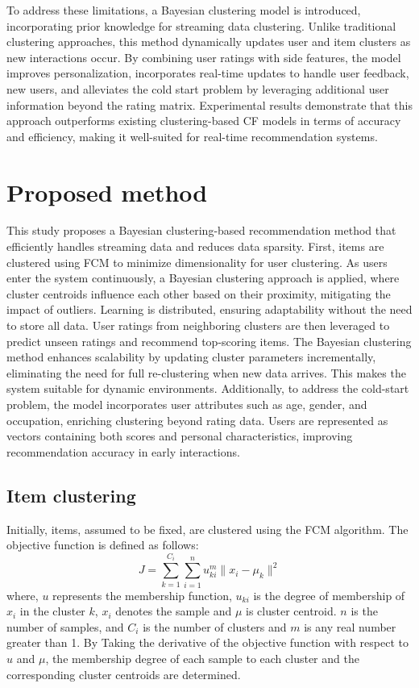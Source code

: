 \documentclass{article}
\begin{document}
To address these limitations, a Bayesian clustering model is introduced, incorporating prior knowledge for streaming data clustering. Unlike traditional clustering approaches, this method dynamically updates user and item clusters as new interactions occur. By combining user ratings with side features, the model improves personalization, incorporates real-time updates to handle user feedback, new users, and alleviates the cold start problem by leveraging additional user information beyond the rating matrix. Experimental results demonstrate that this approach outperforms existing clustering-based CF models in terms of accuracy and efficiency, making it well-suited for real-time recommendation systems. 

\section{Proposed method}

This study proposes a Bayesian clustering-based recommendation method that efficiently handles streaming data and reduces data sparsity. First, items are clustered using FCM to minimize dimensionality for user clustering. As users enter the system continuously, a Bayesian clustering approach is applied, where cluster centroids influence each other based on their proximity, mitigating the impact of outliers. Learning is distributed, ensuring adaptability without the need to store all data. User ratings from neighboring clusters are then leveraged to predict unseen ratings and recommend top-scoring items. The Bayesian clustering method enhances scalability by updating cluster parameters incrementally, eliminating the need for full re-clustering when new data arrives. This makes the system suitable for dynamic environments. Additionally, to address the cold-start problem, the model incorporates user attributes such as age, gender, and occupation, enriching clustering beyond rating data. Users are represented as vectors containing both scores and personal characteristics, improving recommendation accuracy in early interactions.
\subsection{Item clustering}
Initially, items, assumed to be fixed, are clustered using the FCM algorithm. The objective function is defined as follows:
\begin{equation}
    J = \sum_{k=1}^{C_i} \sum_{i=1}^{n} u_{ki}^m \| x_i - \mu_k \|^2
\end{equation}
where, $u$ represents the membership function, $u_{ki}$ is the degree of membership of $x_i$ in the cluster $k$, $x_i$ denotes the sample and $\mu$ is cluster centroid. $n$ is the number of samples, and ${C_i}$ is the number of clusters and $m$ is any real number greater than 1. By Taking the derivative of the objective function with respect to $u$ and $\mu$, the membership degree of each sample to each cluster and the corresponding cluster centroids are determined.
\end{document}
